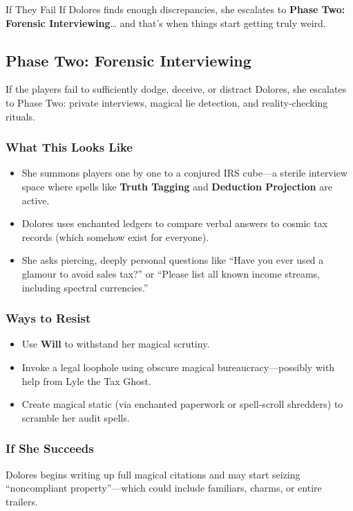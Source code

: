 \begin{multicols}{2}
\begin{CommentBox}{If They Fail}
    If Dolores finds enough discrepancies, she escalates to \textbf{Phase Two: Forensic Interviewing}… and that’s when things start getting truly weird.
\end{CommentBox}

\subsection{Phase Two: Forensic Interviewing}

If the players fail to sufficiently dodge, deceive, or distract Dolores, she escalates to Phase Two: private interviews, magical lie detection, and reality-checking rituals.

\subsubsection*{What This Looks Like}
\begin{itemize}
    \item She summons players one by one to a conjured IRS cube—a sterile interview space where spells like \textbf{Truth Tagging} and \textbf{Deduction Projection} are active.
    \item Dolores uses enchanted ledgers to compare verbal answers to cosmic tax records (which somehow exist for everyone).
    \item She asks piercing, deeply personal questions like “Have you ever used a glamour to avoid sales tax?” or “Please list all known income streams, including spectral currencies.”
\end{itemize}

\subsubsection*{Ways to Resist}
\begin{itemize}
    \item Use \textbf{Will} to withstand her magical scrutiny.
    \item Invoke a legal loophole using obscure magical bureaucracy—possibly with help from Lyle the Tax Ghost.
    \item Create magical static (via enchanted paperwork or spell-scroll shredders) to scramble her audit spells.
\end{itemize}

\subsubsection*{If She Succeeds}
Dolores begins writing up full magical citations and may start seizing “noncompliant property”—which could include familiars, charms, or entire trailers.


\end{multicols}
